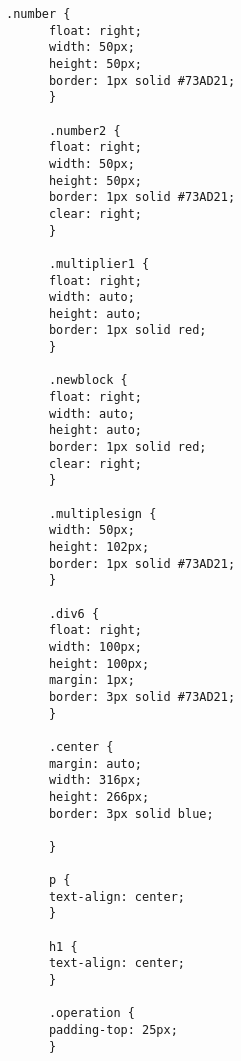 \begin{lstlisting}[caption=mystyle.css]
      .number {
      float: right;
      width: 50px;
      height: 50px;
      border: 1px solid #73AD21;
      }
      
      .number2 {
      float: right;
      width: 50px;
      height: 50px;
      border: 1px solid #73AD21;
      clear: right;
      }
      
      .multiplier1 {
      float: right;
      width: auto;
      height: auto;
      border: 1px solid red;
      }

      .newblock {
      float: right;
      width: auto;
      height: auto;
      border: 1px solid red;
      clear: right;
      }
      
      .multiplesign {
      width: 50px;
      height: 102px;
      border: 1px solid #73AD21;
      }
      
      .div6 {
      float: right;
      width: 100px;
      height: 100px;
      margin: 1px;
      border: 3px solid #73AD21;
      }

      .center {
      margin: auto;
      width: 316px;
      height: 266px;
      border: 3px solid blue;
      
      }

      p {
	  text-align: center;
      }

      h1 {
	  text-align: center;
      }

      .operation {
	  padding-top: 25px;
      }
\end{lstlisting}

